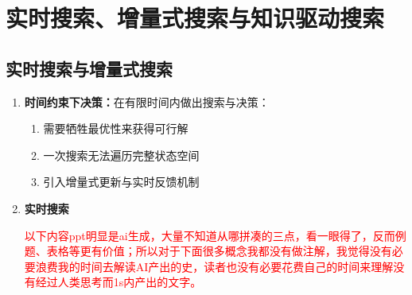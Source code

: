 \documentclass[../main.tex]{subfiles}
\begin{document}
\section{实时搜索、增量式搜索与知识驱动搜索}\label{sec:realtime-incremental-knowledge-search}

\subsection{实时搜索与增量式搜索}\label{sec:realtime-incremental-search}
\begin{enumerate}
    \item \textbf{时间约束下决策：}在有限时间内做出搜索与决策：
        \begin{enumerate}
            \item 需要牺牲最优性来获得可行解
            \item 一次搜索无法遍历完整状态空间
            \item 引入增量式更新与实时反馈机制
        \end{enumerate}
    \item \textbf{实时搜索}
    
    \textcolor{red}{以下内容ppt明显是ai生成，大量不知道从哪拼凑的三点，看一眼得了，反而例题、表格等更有价值；所以对于下面很多概念我都没有做注解，我觉得没有必要浪费我的时间去解读AI产出的史，读者也没有必要花费自己的时间来理解没有经过人类思考而1s内产出的文字。}
    

\end{enumerate}
\end{document}
